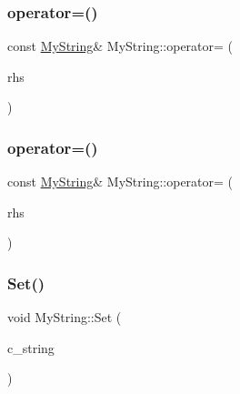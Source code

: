 \mbox{\label{class_my_string_a0156d24764b9d8e4303763750f95cd38}} 
\subsubsection{\texorpdfstring{operator=()}{operator=()}\hspace{0.1cm}{\footnotesize\ttfamily [2/3]}}
{\footnotesize\ttfamily const \mbox{\hyperlink{class_my_string}{My\+String}}\& My\+String\+::operator= (\begin{DoxyParamCaption}\item[{const \mbox{\hyperlink{class_my_string}{My\+String}} \&}]{rhs }\end{DoxyParamCaption})\hspace{0.3cm}{\ttfamily [private]}}

\mbox{\label{class_my_string_a0156d24764b9d8e4303763750f95cd38}} 
\subsubsection{\texorpdfstring{operator=()}{operator=()}\hspace{0.1cm}{\footnotesize\ttfamily [3/3]}}
{\footnotesize\ttfamily const \mbox{\hyperlink{class_my_string}{My\+String}}\& My\+String\+::operator= (\begin{DoxyParamCaption}\item[{const \mbox{\hyperlink{class_my_string}{My\+String}} \&}]{rhs }\end{DoxyParamCaption})\hspace{0.3cm}{\ttfamily [private]}}

\mbox{\label{class_my_string_a521c4cd7eccac6ce554d8a51505e4970}} 
\subsubsection{\texorpdfstring{Set()}{Set()}\hspace{0.1cm}{\footnotesize\ttfamily [1/3]}}
{\footnotesize\ttfamily void My\+String\+::\+Set (\begin{DoxyParamCaption}\item[{const char $\ast$}]{c\+\_\+string }\end{DoxyParamCaption})}

